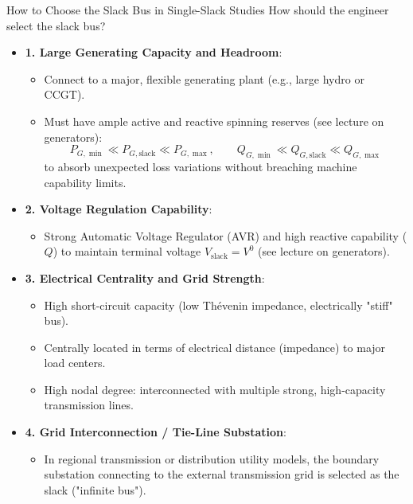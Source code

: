 \begin{frame}[allowframebreaks]{How to Choose the Slack Bus in Single-Slack Studies}
    \alert{How should the engineer select the slack bus?}
    
    \begin{itemize}
        \item \textbf{1. Large Generating Capacity and Headroom}:
        \begin{itemize}
            \item Connect to a major, flexible generating plant (e.g., large hydro or CCGT).
            \item Must have ample active and reactive spinning reserves (see lecture on generators):
            $$P_{G,\min} \ll P_{G,\text{slack}} \ll P_{G,\max}, \qquad Q_{G,\min} \ll Q_{G,\text{slack}} \ll Q_{G,\max}$$
            to absorb unexpected loss variations without breaching machine capability limits.
        \end{itemize}
        \item \textbf{2. Voltage Regulation Capability}:
        \begin{itemize}
            \item Strong Automatic Voltage Regulator (AVR) and high reactive capability ($Q$) to maintain terminal voltage $V_{\text{slack}} = V^0$ (see lecture on generators).
        \end{itemize}
        \item \textbf{3. Electrical Centrality and Grid Strength}:
        \begin{itemize}
            \item High short-circuit capacity (low Thévenin impedance, electrically "stiff" bus).
            \item Centrally located in terms of electrical distance (impedance) to major load centers.
            \item High nodal degree: interconnected with multiple strong, high-capacity transmission lines.
        \end{itemize}
        \item \textbf{4. Grid Interconnection / Tie-Line Substation}:
        \begin{itemize}
            \item In regional transmission or distribution utility models, the boundary substation connecting to the external transmission grid is selected as the slack ("infinite bus").
        \end{itemize}
    \end{itemize}
\end{frame}

